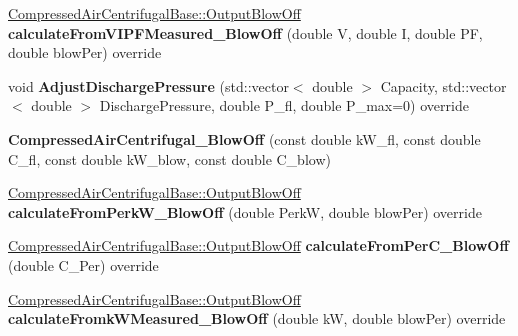 \begin{DoxyCompactItemize}
\hyperlink{struct_compressed_air_centrifugal_base_1_1_output_blow_off}{Compressed\+Air\+Centrifugal\+Base\+::\+Output\+Blow\+Off} {\bfseries calculate\+From\+V\+I\+P\+F\+Measured\+\_\+\+Blow\+Off} (double V, double I, double PF, double blow\+Per) override
\item 
\mbox{\label{class_compressed_air_centrifugal___blow_off_acfb335ebe27d1108346f781084c1204b}} 
void {\bfseries Adjust\+Discharge\+Pressure} (std\+::vector$<$ double $>$ Capacity, std\+::vector$<$ double $>$ Discharge\+Pressure, double P\+\_\+fl, double P\+\_\+max=0) override
\item 
\mbox{\label{class_compressed_air_centrifugal___blow_off_a10619d63e61cde321c4a06c95182a680}} 
{\bfseries Compressed\+Air\+Centrifugal\+\_\+\+Blow\+Off} (const double k\+W\+\_\+fl, const double C\+\_\+fl, const double k\+W\+\_\+blow, const double C\+\_\+blow)
\item 
\mbox{\label{class_compressed_air_centrifugal___blow_off_a56daf95bed497c129f746779422bf1e9}} 
\hyperlink{struct_compressed_air_centrifugal_base_1_1_output_blow_off}{Compressed\+Air\+Centrifugal\+Base\+::\+Output\+Blow\+Off} {\bfseries calculate\+From\+Perk\+W\+\_\+\+Blow\+Off} (double PerkW, double blow\+Per) override
\item 
\mbox{\label{class_compressed_air_centrifugal___blow_off_af936835bda6d42e87cff50b09ddfbdc0}} 
\hyperlink{struct_compressed_air_centrifugal_base_1_1_output_blow_off}{Compressed\+Air\+Centrifugal\+Base\+::\+Output\+Blow\+Off} {\bfseries calculate\+From\+Per\+C\+\_\+\+Blow\+Off} (double C\+\_\+\+Per) override
\item 
\mbox{\label{class_compressed_air_centrifugal___blow_off_a389dc686d3f9b8f8307a11e203350f90}} 
\hyperlink{struct_compressed_air_centrifugal_base_1_1_output_blow_off}{Compressed\+Air\+Centrifugal\+Base\+::\+Output\+Blow\+Off} {\bfseries calculate\+Fromk\+W\+Measured\+\_\+\+Blow\+Off} (double kW, double blow\+Per) override
\item 
\mbox{\label{class_compressed_air_centrifugal___blow_off_a3025676e9f8fbb1425316313517203fb}} 

\end{DoxyCompactItemize}
